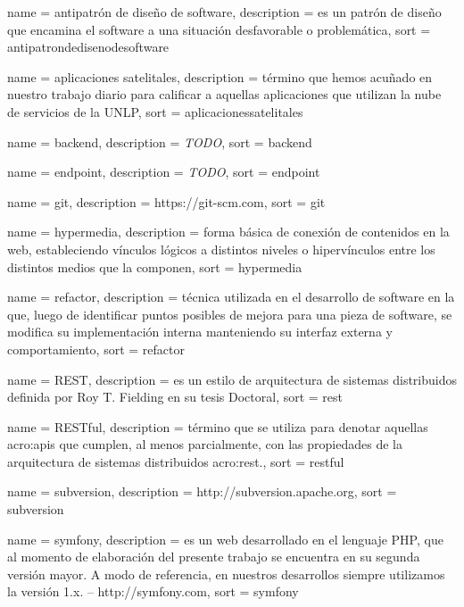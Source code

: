  {
  name = {antipatrón de diseño de software},
  description = {es un patrón de diseño que encamina el software a una situación desfavorable o problemática},
  sort = {antipatrondedisenodesoftware}
}

 {
  name = {aplicaciones satelitales},
  description = {término que hemos acuñado en nuestro trabajo diario para calificar a aquellas aplicaciones que utilizan la nube de servicios de la UNLP},
  sort = {aplicacionessatelitales}
}

 {
  name = {backend},
  description = {\textit{TODO}},
  sort = {backend}
}

 {
  name = {endpoint},
  description = {\textit{TODO}},
  sort = {endpoint}
}

 {
  name = {git},
  description = {https://git-scm.com},
  sort = {git}
}

 {
  name = {hypermedia},
  description = {forma básica de conexión de contenidos en la web, estableciendo vínculos lógicos a distintos niveles o hipervínculos entre los distintos medios que la componen},
  sort = {hypermedia}
}

 {
  name = {refactor},
  description = {técnica utilizada en el desarrollo de software en la que, luego de identificar puntos posibles de mejora para una pieza de software, se modifica su implementación interna manteniendo su interfaz externa y comportamiento},
  sort = {refactor}
}

 {
  name = {REST},
  description = {es un estilo de arquitectura de sistemas distribuidos definida por Roy T. Fielding en su tesis Doctoral},
  sort = {rest}
}

 {
  name = {RESTful},
  description = {término que se utiliza para denotar aquellas \glspl{acro:api} que cumplen, al menos parcialmente, con las propiedades de la arquitectura de sistemas distribuidos \gls{acro:rest}.},
  sort = {restful}
}

 {
  name = {subversion},
  description = {http://subversion.apache.org},
  sort = {subversion}
}

 {
  name = {symfony},
  description = {es un  web desarrollado en el lenguaje PHP, que al momento de elaboración del presente trabajo se encuentra en su segunda versión mayor. A modo de referencia, en nuestros desarrollos siempre utilizamos la versión 1.x. – http://symfony.com},
  sort = {symfony}
}

